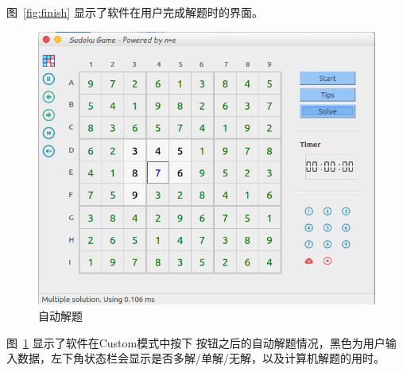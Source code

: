 \documentclass[a4paper]{article}
\begin{document}
图~\ref{fig:finish} 显示了软件在用户完成解题时的界面。

\begin{figure}[htp]
\centering
\includegraphics[width=0.7\linewidth]{solve.png}
\caption{自动解题}
\label{fig:solve}
\end{figure}

图~\ref{fig:solve} 显示了软件在Custom模式中按下  按钮之后的自动解题情况，黑色为用户输入数据，左下角状态栏会显示是否多解/单解/无解，以及计算机解题的用时。
\end{document}
